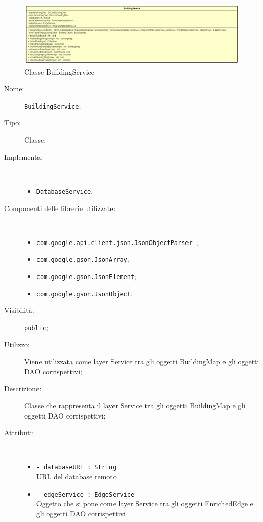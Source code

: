 \documentclass[../DefinizioneDiProdotto.tex]{subfiles}
\begin{document}
    \begin{figure}[H]
        \centering
        \includegraphics{img/BuildingService.png}
        \caption{Classe BuildingService}\label{fig:model::dataaccess::service::BuildingService} 
    \end{figure}
    \begin{description}
\item[Nome:] \texttt{BuildingService};
\item[Tipo:] Classe;
\item[Implementa:] \
\begin{itemize}
\item \texttt{DatabaseService}.

\end{itemize}
\item[Componenti delle librerie utilizzate:] \
\begin{itemize}
\item \texttt{com.google.api.client.json.JsonObjectParser
};

\item \texttt{com.google.gson.JsonArray};

\item \texttt{com.google.gson.JsonElement};

\item \texttt{com.google.gson.JsonObject}.

\end{itemize}
\item[Visibilità:] \texttt{public};
\item[Utilizzo:] Viene utilizzata come layer Service tra gli oggetti BuildingMap e gli oggetti DAO corrispettivi;
\item[Descrizione:] Classe che rappresenta il layer Service tra gli oggetti BuildingMap e gli oggetti DAO corrispettivi;
\item[Attributi:] \
\begin{itemize}
\item \texttt{- databaseURL : String}\\
URL del database remoto

\item \texttt{- edgeService : EdgeService}\\
Oggetto che si pone come layer Service tra gli oggetti EnrichedEdge e gli oggetti DAO corrispettivi


\end{itemize}
\end{description}
\end{document}
